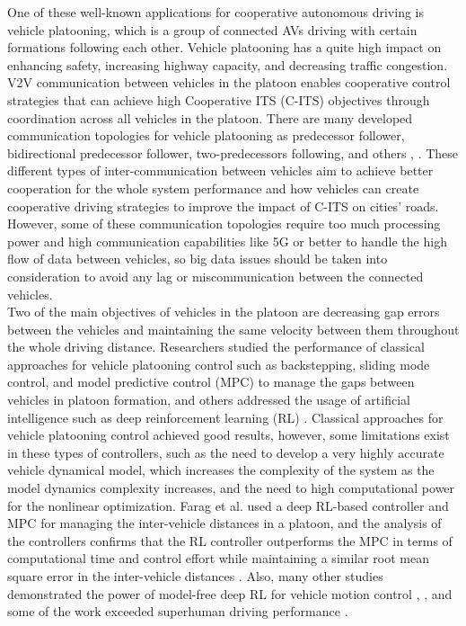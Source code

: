 One of these well-known applications for cooperative autonomous driving is vehicle platooning, which is a group of connected AVs driving with certain formations following each other. Vehicle platooning has a quite high impact on enhancing safety, increasing highway capacity, and decreasing traffic congestion\cite{kavathekar2011vehicle}. V2V communication between vehicles in the platoon enables cooperative control strategies that can achieve high Cooperative ITS (C-ITS) objectives through coordination across all vehicles in the platoon. There are many developed communication topologies for vehicle platooning as predecessor follower, bidirectional predecessor follower, two-predecessors following, and others \cite{li2017distributed}, \cite{zheng2015stability}. These different types of inter-communication between vehicles aim to achieve better cooperation for the whole system performance and how vehicles can create cooperative driving strategies to improve the impact of C-ITS on cities' roads. However, some of these communication topologies require too much processing power and high communication capabilities like 5G or better to handle the high flow of data between vehicles, so big data issues should be taken into consideration to avoid any lag or miscommunication between the connected vehicles.\\
Two of the main objectives of vehicles in the platoon are decreasing gap errors between the vehicles and maintaining the same velocity between them throughout the whole driving distance. Researchers studied the performance of classical approaches for vehicle platooning control such as backstepping, sliding mode control, and model predictive control (MPC) \cite{shalaby2019design} to manage the gaps between vehicles in platoon formation, and others addressed the usage of artificial intelligence such as deep reinforcement learning (RL) \cite{chu2019model}. Classical approaches for vehicle platooning control achieved good results, however, some limitations exist in these types of controllers, such as the need to develop a very highly accurate vehicle dynamical model, which increases the complexity of the system as the model dynamics complexity increases, and the need to high computational power for the nonlinear optimization. Farag et al. used a deep RL-based controller and MPC for managing the inter-vehicle distances in a platoon, and the analysis of the controllers confirms that the RL controller outperforms the MPC in terms of computational time and control effort while maintaining a similar root mean square error in the inter-vehicle distances \cite{faragreinforcement}. Also, many other studies demonstrated the power of model-free deep RL for vehicle motion control \cite{jaritz2018end}, \cite{cai2020high}, and some of the work exceeded superhuman driving performance \cite{fuchs2021super}.

